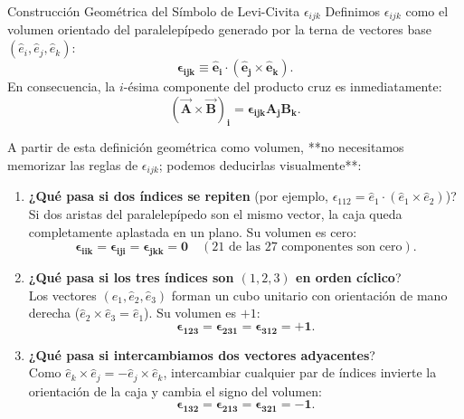 \documentclass[11pt,letterpaper]{article}
\begin{document}
\begin{theorembox}{Construcción Geométrica del Símbolo de Levi-Civita $\epsilon_{ijk}$}
Definimos $\epsilon_{ijk}$ como el volumen orientado del paralelepípedo generado por la terna de vectores base $(\hat{e}_i, \hat{e}_j, \hat{e}_k)$:
\[
\mathbf{\epsilon_{ijk} \equiv \hat{e}_i \cdot (\hat{e}_j \times \hat{e}_k)}.
\]
En consecuencia, la $i$-ésima componente del producto cruz es inmediatamente:
\[
\mathbf{(\vec{A} \times \vec{B})_i = \epsilon_{ijk} A_j B_k}.
\]
\end{theorembox}

A partir de esta definición geométrica como volumen, **no necesitamos memorizar las reglas de $\epsilon_{ijk}$; podemos deducirlas visualmente**:

\begin{enumerate}
    \item \textbf{¿Qué pasa si dos índices se repiten} (por ejemplo, $\epsilon_{112} = \hat{e}_1 \cdot (\hat{e}_1 \times \hat{e}_2)$)?\\
    Si dos aristas del paralelepípedo son el mismo vector, la caja queda completamente aplastada en un plano. Su volumen es cero:
    \[
    \mathbf{\epsilon_{iik} = \epsilon_{iji} = \epsilon_{jkk} = 0} \quad (\text{21 de las 27 componentes son cero}).
    \]
    \item \textbf{¿Qué pasa si los tres índices son $(1, 2, 3)$ en orden cíclico}?\\
    Los vectores $(\hat{e}_1, \hat{e}_2, \hat{e}_3)$ forman un cubo unitario con orientación de mano derecha ($\hat{e}_2 \times \hat{e}_3 = \hat{e}_1$). Su volumen es $+1$:
    \[
    \mathbf{\epsilon_{123} = \epsilon_{231} = \epsilon_{312} = +1}.
    \]
    \item \textbf{¿Qué pasa si intercambiamos dos vectores adyacentes}?\\
    Como $\hat{e}_k \times \hat{e}_j = -\hat{e}_j \times \hat{e}_k$, intercambiar cualquier par de índices invierte la orientación de la caja y cambia el signo del volumen:
    \[
    \mathbf{\epsilon_{132} = \epsilon_{213} = \epsilon_{321} = -1}.
    \]
\end{enumerate}
\end{document}
